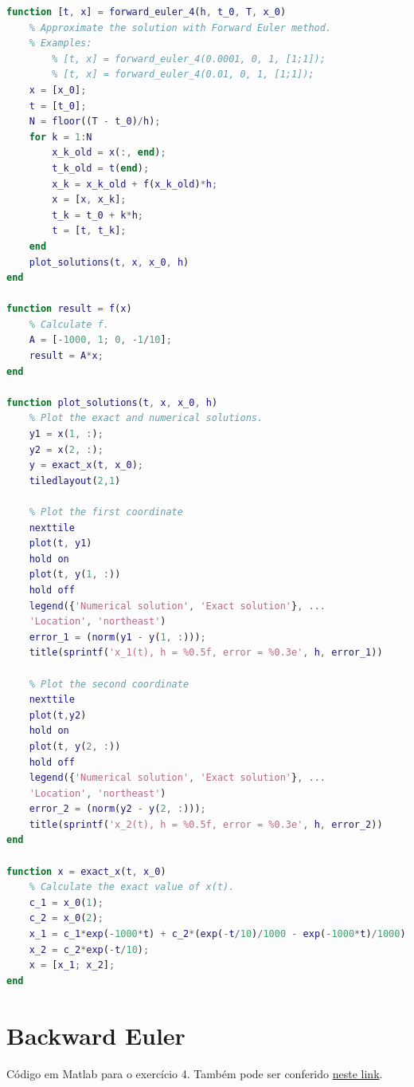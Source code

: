 \documentclass{article}
\begin{document}
        \begin{lstlisting}[language=Matlab]
function [t, x] = forward_euler_4(h, t_0, T, x_0)
    % Approximate the solution with Forward Euler method.
    % Examples:
        % [t, x] = forward_euler_4(0.0001, 0, 1, [1;1]);
        % [t, x] = forward_euler_4(0.01, 0, 1, [1;1]);
    x = [x_0];
    t = [t_0];
    N = floor((T - t_0)/h);
    for k = 1:N
        x_k_old = x(:, end);
        t_k_old = t(end);
        x_k = x_k_old + f(x_k_old)*h;
        x = [x, x_k];
        t_k = t_0 + k*h;
        t = [t, t_k];
    end
    plot_solutions(t, x, x_0, h)
end

function result = f(x)
    % Calculate f.
    A = [-1000, 1; 0, -1/10];
    result = A*x;
end

function plot_solutions(t, x, x_0, h)
    % Plot the exact and numerical solutions.
    y1 = x(1, :);
    y2 = x(2, :);
    y = exact_x(t, x_0);
    tiledlayout(2,1)
    
    % Plot the first coordinate
    nexttile
    plot(t, y1)
    hold on
    plot(t, y(1, :))
    hold off
    legend({'Numerical solution', 'Exact solution'}, ...
    'Location', 'northeast')
    error_1 = (norm(y1 - y(1, :)));
    title(sprintf('x_1(t), h = %0.5f, error = %0.3e', h, error_1))

    % Plot the second coordinate
    nexttile
    plot(t,y2)
    hold on
    plot(t, y(2, :))
    hold off
    legend({'Numerical solution', 'Exact solution'}, ...
    'Location', 'northeast')
    error_2 = (norm(y2 - y(2, :)));
    title(sprintf('x_2(t), h = %0.5f, error = %0.3e', h, error_2))
end

function x = exact_x(t, x_0)
    % Calculate the exact value of x(t).
    c_1 = x_0(1);
    c_2 = x_0(2);
    x_1 = c_1*exp(-1000*t) + c_2*(exp(-t/10)/1000 - exp(-1000*t)/1000);
    x_2 = c_2*exp(-t/10);
    x = [x_1; x_2];
end
        \end{lstlisting}

    \section{Backward Euler}
        \label{appendix:backward_euler}

        Código em Matlab para o exercício 4. Também pode ser conferido
        \href{https://github.com/lucasresck/introduction-to-numerical-analysis/blob/master/list_4/backward_euler_4.m}{neste link}.
\end{document}
